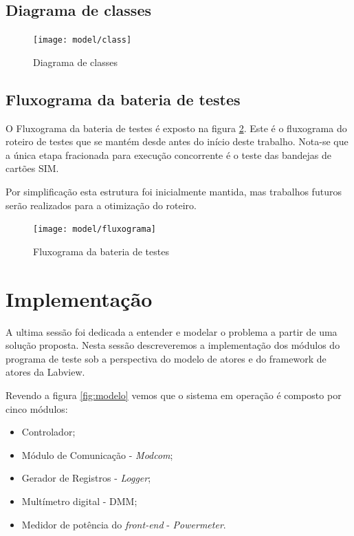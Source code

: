         \subsection{Diagrama de classes}
            \begin{figure}
                \centering
                \texttt{[image: model/class]}
                \caption{Diagrama de classes}
                \label{fig:classdiagram}
            \end{figure}
            
        
        \subsection{Fluxograma da bateria de testes}
            O Fluxograma da bateria de testes é exposto na figura \ref{fig:flowchart}. Este é o fluxograma do roteiro de testes que se mantém desde antes do início deste trabalho. Nota-se que a única etapa fracionada para execução concorrente é o teste das bandejas de cartões SIM. 
            
            Por simplificação esta estrutura foi inicialmente mantida, mas trabalhos futuros serão realizados para a otimização do roteiro.
            
            \begin{figure}
                \centering
                \texttt{[image: model/fluxograma]}
                \caption{Fluxograma da bateria de testes}
                \label{fig:flowchart}
            \end{figure}
        
    \clearpage
    \section{Implementação}
    
        A ultima sessão foi dedicada a entender e modelar o problema a partir de uma solução proposta. Nesta sessão descreveremos a implementação dos módulos do programa de teste sob a perspectiva do modelo de atores e do framework de atores da Labview.
        
        Revendo a figura \ref{fig:modelo} vemos que o sistema em operação é composto por cinco módulos:
        \begin{itemize}
            \item Controlador;
            \item Módulo de Comunicação - \textit{Modcom};
            \item Gerador de Registros - \textit{Logger};
            \item Multímetro digital - DMM;
            \item Medidor de potência do \textit{front-end} - \textit{Powermeter}.
        \end{itemize} 
        

